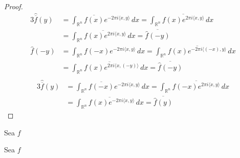 \begin{proof}
\begin{alignat}{3}
        \widehat{\overline{f}}(y) &= \int_{\mathbb{R}^n} \overline{f(x)}e^{-2\pi i \langle x, y \rangle} \, dx = \int_{\mathbb{R}^n} \overline{f(x)e^{2\pi i \langle x, y \rangle}} \, dx \\ &=  \overline{\int_{\mathbb{R}^n} f(x)e^{2\pi i \langle x, y \rangle} \, dx } =\overline{\widehat{f}(-y)} \\
        \widehat{f}(-y) &= \int_{\mathbb{R}^n} f(-x)e^{-2\pi i \langle x, y \rangle} \, dx = \int_{\mathbb{R}^n} \overline{f(x)e^{-2\pi i \langle (-x), y \rangle}} \, dx \\ &=  \overline{\int_{\mathbb{R}^n} f(x)e^{2\pi i \langle x, (-y) \rangle} \, dx } =\overline{\widehat{f}(-y)} \\
\end{alignat}
\begin{alignat}{3}
       \widehat{\overline{f}}(y) &= \int_{\mathbb{R}^n} \overline{f(-x)}e^{-2\pi i \langle x, y \rangle} \, dx = \int_{\mathbb{R}^n} \overline{f(-x)e^{2\pi i \langle x, y \rangle}} \, dx \\ &=  \overline{\int_{\mathbb{R}^n} f(x)e^{-2\pi i \langle x, y \rangle} \, dx } =\overline{\widehat{f}(y)}
\end{alignat}
\end{proof}

\begin{proposicion}
    Sea $f$
\end{proposicion}



\begin{proposicion}
    Sea $f$
\end{proposicion}

    

    







